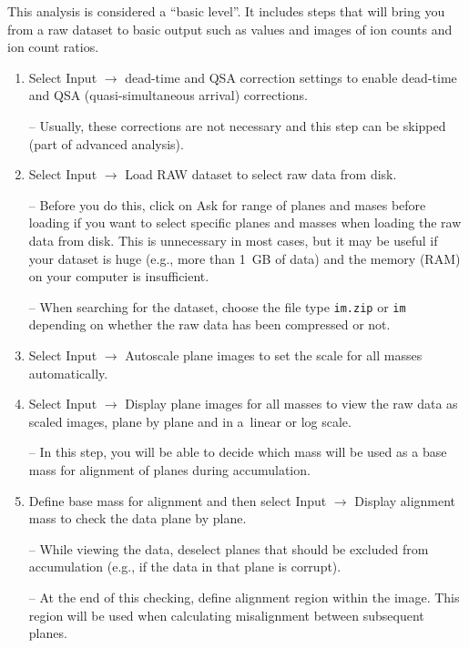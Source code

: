 \documentclass[a4paper, 11pt]{article}
\newcommand{\ttt}[1]{\texttt{#1}}
\newcommand{\lans}[1]{{\color{magenta}#1}}
\newcommand{\lanscb}[1]{{\color{darkgreen}#1}}
\newcommand{\lanstf}[1]{{\color{cyan}#1}}
\newcommand\ra{\rightarrow}
\newcommand\addon[1]{-- {\small #1}}
\begin{document}
This analysis is considered a ``basic level''. It includes steps that will bring you from a raw dataset to basic output such as values and images of ion counts and ion count ratios.

\begin{enumerate}

\item Select \lans{Input} $\ra$ \lans{dead-time and QSA correction settings} to enable dead-time and QSA (quasi-simultaneous arrival) corrections.

\addon{Usually, these corrections are not necessary and this step can be skipped (part of advanced analysis).}

\item Select \lans{Input} $\ra$ \lans{Load RAW dataset} to select raw data from disk. 

\addon{Before you do this, click on \lans{Ask for range of planes and mases before loading} if you want to select specific planes and masses when loading the raw data from disk. This is unnecessary in most cases, but it may be useful if your dataset is huge (e.g., more than 1~GB of data) and the memory (RAM) on your computer is insufficient.}

\addon{When searching for the dataset, choose the file type \ttt{im.zip} or \ttt{im} depending on whether the raw data has been compressed or not.}

\item Select \lans{Input} $\ra$ \lans{Autoscale plane images} to set the scale for all masses automatically. 

\item Select \lans{Input} $\ra$ \lans{Display plane images for all masses} to view the raw data as scaled images, plane by plane and in a~linear or log scale. 

\addon{In this step, you will be able to decide which mass will be used as a \lanstf{base mass for alignment} of planes during accumulation.}

\item Define \lanstf{base mass for alignment} and then select \lans{Input} $\ra$ \lans{Display alignment mass} to check the data plane by plane. 

\addon{While viewing the data, \lanscb{deselect planes} that should be excluded from accumulation (e.g., if the data in that plane is corrupt).}

\addon{At the end of this checking, \lans{define alignment region} within the image. This region will be used when calculating misalignment between subsequent planes. }


\end{enumerate}
\end{document}
